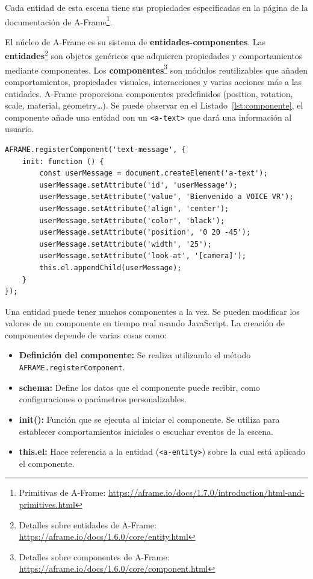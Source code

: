 \documentclass[a4paper, 12pt]{book}
\begin{document}
Cada entidad de esta escena tiene sus propiedades especificadas en la página de la documentación de A-Frame\footnote{Primitivas de A-Frame: \scriptsize\url{https://aframe.io/docs/1.7.0/introduction/html-and-primitives.html}}.

El núcleo de A-Frame es su sistema de \textbf{entidades-componentes}. Las \textbf{entidades}\footnote{Detalles sobre entidades de A-Frame: \scriptsize\url{https://aframe.io/docs/1.6.0/core/entity.html}} son objetos genéricos que adquieren propiedades y comportamientos mediante componentes. Los \textbf{componentes}\footnote{Detalles sobre componentes de A-Frame: \scriptsize\url{https://aframe.io/docs/1.6.0/core/component.html}} son módulos reutilizables que añaden comportamientos, propiedades visuales, interacciones y varias acciones más a las entidades. A-Frame proporciona componentes predefinidos (position, rotation, scale, material, geometry\ldots). Se puede observar en el Listado~\ref{lst:componente}, el componente añade una entidad con un \texttt{<a-text>} que dará una información al usuario.

\begin{lstlisting}[language=HTML, caption=Crear Componente, captionpos=b, label=lst:componente]
  AFRAME.registerComponent('text-message', {
    init: function () {
        const userMessage = document.createElement('a-text');
        userMessage.setAttribute('id', 'userMessage');
        userMessage.setAttribute('value', 'Bienvenido a VOICE VR');
        userMessage.setAttribute('align', 'center');
        userMessage.setAttribute('color', 'black');
        userMessage.setAttribute('position', '0 20 -45');
        userMessage.setAttribute('width', '25');
        userMessage.setAttribute('look-at', '[camera]');
        this.el.appendChild(userMessage);
    }
});
\end{lstlisting}

Una entidad puede tener muchos componentes a la vez. Se pueden modificar los valores de un componente en tiempo real usando JavaScript. La creación de componentes depende de varias cosas como:
\begin{itemize}
  \item \textbf{Definición del componente:} Se realiza utilizando el método \texttt{AFRAME.registerComponent}.
  
  \item \textbf{schema:} Define los datos que el componente puede recibir, como configuraciones o parámetros personalizables.
  
  \item \textbf{init():} Función que se ejecuta al iniciar el componente. Se utiliza para establecer comportamientos iniciales o escuchar eventos de la escena.
  
  \item \textbf{this.el:} Hace referencia a la entidad (\texttt{<a-entity>}) sobre la cual está aplicado el componente.
\end{itemize}
\end{document}
